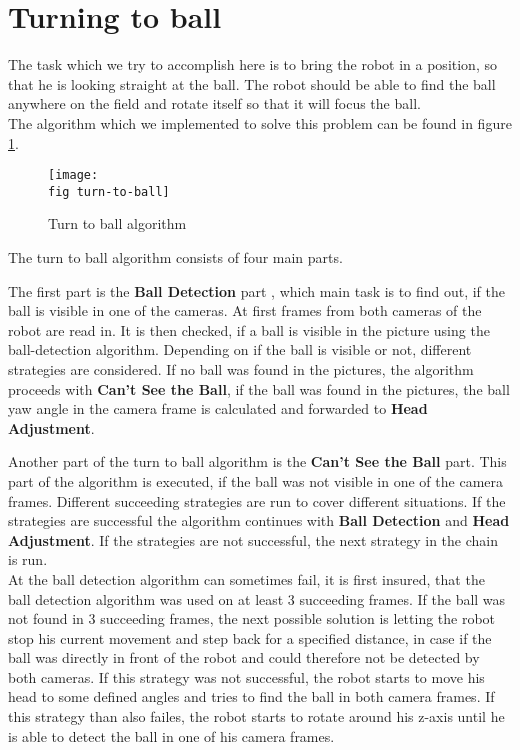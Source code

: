 \section{Turning to ball}
\label{j sec turning to ball}
The task which we try to accomplish here is to bring the robot in a position, so that he is looking straight at the ball.
The robot should be able to find the ball anywhere on the field and rotate itself so that it will focus the ball. \\
The algorithm which we implemented to solve this problem can be found in figure \ref{j figure turn to ball}.

\begin{figure}[ht]
	\texttt{[image: \\fig turn-to-ball]}
	\caption{Turn to ball algorithm}
	\label{j figure turn to ball}
\end{figure}

The turn to ball algorithm consists of four main parts. 


The first part is the \textbf{Ball Detection} part \label{j sec ball detection}, which main task is to find out, if the ball is visible in one of the cameras. At first frames from both cameras of the robot are read in. It is then checked, if a ball is visible in the picture using the ball-detection algorithm. Depending on if the ball is visible or not, different strategies are considered. If no ball was found in the pictures, the algorithm proceeds with \textbf{Can't See the Ball}, if the ball was found in the pictures, the ball yaw angle in the camera frame is calculated and forwarded to \textbf{Head Adjustment}.

Another part of the turn to ball algorithm is the \textbf{Can't See the Ball} part.
This part of the algorithm is executed, if the ball was not visible in one of the camera frames. Different succeeding strategies are run to cover different situations. If the strategies are successful the algorithm continues with \textbf{Ball Detection} and \textbf{Head Adjustment}. If the strategies are not successful, the next strategy in the chain is run. \\
At the ball detection algorithm can sometimes fail, it is first insured, that 
the ball detection algorithm was used on at least 3 succeeding frames. If the ball was not found in 3 succeeding frames, the next possible solution is letting the robot stop his current movement and step back for a specified distance, in case if the ball was directly in front of the robot and could therefore not be detected by both cameras. If this strategy was not successful, the robot starts to move his head to some defined angles and tries to find the ball in both camera frames. If this strategy than also failes, the robot starts to rotate around his z-axis until he is able to detect the ball in one of his camera frames.

